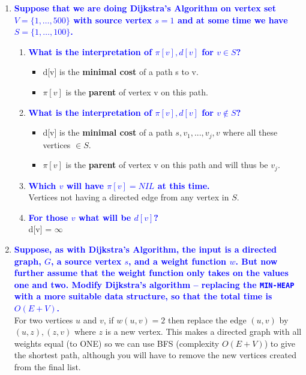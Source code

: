 \documentclass[11pt]{article}
\begin{document}
\begin{enumerate}
\item \textbf{\textcolor{blue}{Suppose that we are doing Dijkstra's Algorithm on vertex set $V=\{1,\ldots,500\}$ with source vertex $s=1$ and at some time we have $S=\{1,\ldots,100\}$.}}
    \begin{enumerate}
    \item \textbf{\textcolor{blue}{What is the interpretation of $\pi[v],d[v]$ for $v\in S$?}}
        \begin{itemize}
            \item d[v] is the \textbf{minimal cost} of a path s to v.
            \item $\pi[v]$ is the \textbf{parent} of vertex v on this path.
        \end{itemize} 
    \item \textbf{\textcolor{blue}{What is the interpretation of $\pi[v],d[v]$ for $v\not\in S$?}}
        \begin{itemize}
            \item d[v] is the \textbf{minimal cost} of a path $s, v_1, ..., v_j, v$ where all these vertices $\in S$.
            \item $\pi[v]$ is the \textbf{parent} of vertex v on this path and will thus be $v_j$.
        \end{itemize}
    \item \textbf{\textcolor{blue}{Which $v$ will have $\pi[v]=NIL$ at this time.}}
        \\ Vertices not having a directed edge from any vertex in $S$.
    \item \textbf{\textcolor{blue}{For those $v$ what will be $d[v]$?}}
        \\ d[v] = $\infty$
    \end{enumerate}
    
\item \textbf{\textcolor{blue}{Suppose, as with Dijkstra's Algorithm, the input is a directed graph, $G$, a source vertex $s$, and a weight function $w$.  But now further assume that the weight function only takes on the values one and two. Modify Dijkstra's algorithm -- replacing the {\tt MIN-HEAP} with a more suitable data structure, so that the total time is $O(E+V)$.}}
    \\ For two vertices $u$ and $v$, if $w(u,v) = 2$ then replace the edge $(u,v)$ by $(u,z),(z,v)$ where $z$ is a new vertex. This makes a directed graph with all weights equal (to ONE) so we can use BFS (complexity $O(E + V)$) to give the shortest path, although you will have to remove the new vertices created from the final list.
    

\end{enumerate}
\end{document}
